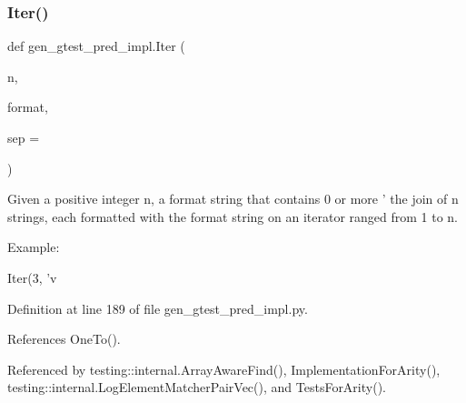\subsubsection{\texorpdfstring{Iter()}{Iter()}}
{\footnotesize\ttfamily def gen\+\_\+gtest\+\_\+pred\+\_\+impl.\+Iter (\begin{DoxyParamCaption}\item[{}]{n,  }\item[{}]{format,  }\item[{}]{sep = {\ttfamily \textquotesingle{}\textquotesingle{}} }\end{DoxyParamCaption})}

\begin{DoxyVerb}Given a positive integer n, a format string that contains 0 or
more '%
the join of n strings, each formatted with the format string on an
iterator ranged from 1 to n.

Example:

Iter(3, 'v%
\end{DoxyVerb}
 

Definition at line 189 of file gen\+\_\+gtest\+\_\+pred\+\_\+impl.\+py.



References One\+To().



Referenced by testing\+::internal.\+Array\+Aware\+Find(), Implementation\+For\+Arity(), testing\+::internal.\+Log\+Element\+Matcher\+Pair\+Vec(), and Tests\+For\+Arity().


